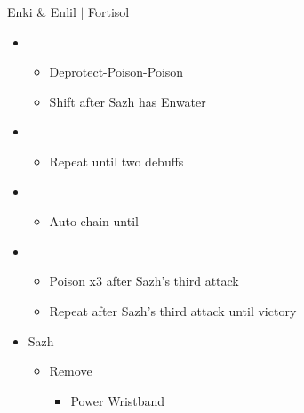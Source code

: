 \begin{battle}{Enki \& Enlil $|$ Fortisol}
\begin{multicols}{2}
\begin{itemize}
    \item \third
    \begin{itemize}
        \item Deprotect-Poison-Poison
        \item Shift after Sazh has Enwater
    \end{itemize}
    \item \fifth
    \begin{itemize}
        \item Repeat until two debuffs
    \end{itemize}
    \item \fourth
    \begin{itemize}
        \item Auto-chain until \stagger
    \end{itemize}
    \item \sixth
    \begin{itemize}
        \item Poison x3 after Sazh's third attack
        \item Repeat after Sazh's third attack until victory
    \end{itemize}
\end{itemize}
\vfill\null
\end{multicols}
\end{battle}
\begin{menu}
\begin{itemize}
    \equip
    \begin{itemize}
        \item Sazh
        \begin{itemize}
            \item Remove
            \begin{itemize}
                \item Power Wristband
            \end{itemize}
        \end{itemize}
    \end{itemize}
\end{itemize}
\end{menu}
